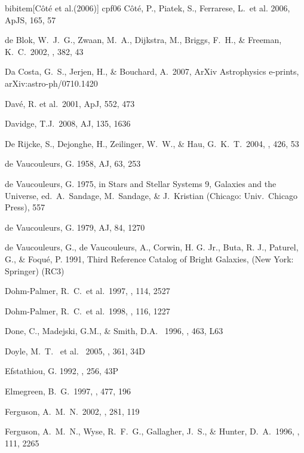 \documentclass[preprint]{aastex}
\begin{document}
\begin{thebibliography}{}
bibitem[C\^ot\'e et al.(2006)] {cpf06}
C\^ot\'e, P., Piatek, S., Ferrarese, L.~et al. 2006, ApJS, 165, 57

 de Blok, W.~J.~G., 
Zwaan, M.~A., Dijkstra, M., Briggs, F.~H., \& Freeman, K.~C.\ 2002, \aap, 
382, 43 

Da Costa, G.~S., Jerjen, H., \& Bouchard, A.\ 2007, ArXiv Astrophysics e-prints, arXiv:astro-ph/0710.1420

Dav\'e, R. et al.\ 2001, ApJ, 552, 473

Davidge, T.J.\ 2008, AJ, 135, 1636

De Rijcke, S., Dejonghe, H., Zeilinger, W.~W., \& Hau, G.~K.~T.\ 2004, \aap, 426, 53 

de Vaucouleurs, G. 1958, AJ, 63, 253

de Vaucouleurs, G. 1975, in Stars and Stellar Systems 9, Galaxies
and the Universe, ed.\ A.\ Sandage, M.\ Sandage, \& J.\ Kristian
(Chicago: Univ.\ Chicago Press), 557

de Vaucouleurs, G. 1979, AJ, 84, 1270

de Vaucouleurs, G., de Vaucouleurs, A., Corwin, H. G. Jr.,
Buta, R. J., Paturel, G., \& Foqu\'e, P. 1991, Third Reference
Catalog of Bright Galaxies, (New York: Springer) (RC3)

Dohm-Palmer, R.~C.~et al.\ 1997, \aj, 114, 2527 

Dohm-Palmer, R.~C.~et al.\ 1998, \aj, 116, 1227 

Done, C., Madejski, G.M., \& Smith, D.A. \ 1996, \apj, 463, L63 

Doyle, M.~T. ~et al. \ 2005, \mnras, 361, 34D 

Efstathiou, G. 1992, \mnras, 256, 43P 

Elmegreen, B.~G.\ 1997, \apj, 477, 196 

Ferguson, A.~M.~N.\ 2002, \apss, 281, 119 

Ferguson, A.~M.~N., Wyse, R.~F.~G., Gallagher, J.~S., \& Hunter, D.~A.\ 
1996, \aj, 111, 2265 


\end{thebibliography}
\end{document}
